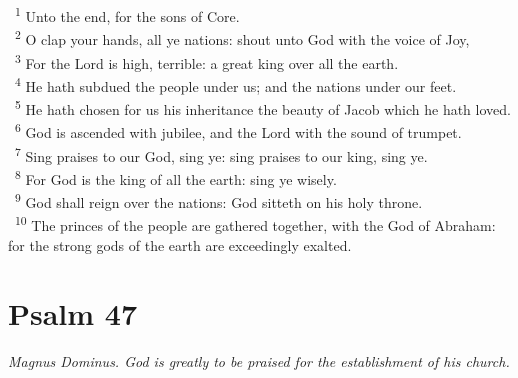 \documentclass[a5paper,12pt]{article}
\begin{document}
\begin{multicols*}{2}
~\textsuperscript{1} Unto the end, for the sons of Core.\\
~\textsuperscript{2} O clap your hands, all ye nations: shout unto God with the voice of Joy,\\
~\textsuperscript{3} For the Lord is high, terrible: a great king over all the earth.\\
~\textsuperscript{4} He hath subdued the people under us; and the nations under our feet.\\
~\textsuperscript{5} He hath chosen for us his inheritance the beauty of Jacob which he hath loved.\\
~\textsuperscript{6} God is ascended with jubilee, and the Lord with the sound of trumpet.\\
~\textsuperscript{7} Sing praises to our God, sing ye: sing praises to our king, sing ye.\\
~\textsuperscript{8} For God is the king of all the earth: sing ye wisely.\\
~\textsuperscript{9} God shall reign over the nations: God sitteth on his holy throne.\\
~\textsuperscript{10} The princes of the people are gathered together, with the God of Abraham: for the strong gods of the earth are exceedingly exalted.\\

\section{Psalm 47}
\label{sec:org9341c23}
\emph{Magnus Dominus. God is greatly to be praised for the establishment of his church.}\\


\end{multicols*}
\end{document}
